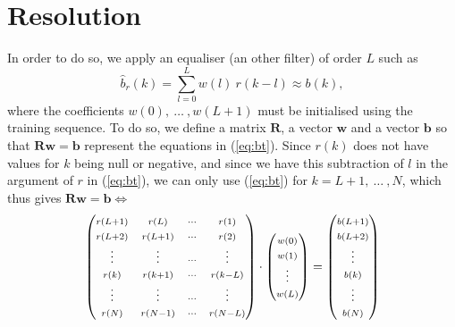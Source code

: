 \documentclass[twocolumn, 12pt]{IEEEtran}
\begin{document}
 \section{Resolution}
 
 In order to do so, we apply an equaliser (an other filter) of order $L$ such as 
 \begin{equation}\label{eq:bt}
 { \hat{b}_{r}(k) = \sum\limits_{l=0}^{L}w(l)~r(k-l) \approx b(k) },
 \end{equation}
 where the coefficients ${w(0)},~{\dots~},{w(L+1)}$ must be initialised using the training sequence. To do so, we define a matrix $\bm{R}$, a vector $\bm{w}$ and a vector $\bm{b}$ so that $\bm{Rw}=\bm{b}$ represent the equations in (\ref{eq:bt}). Since $r(k)$ does not have values for $k$ being null or negative, and since we have this subtraction of $l$ in the argument of $r$ in (\ref{eq:bt}), we can only use (\ref{eq:bt}) for $k = L+1,~\dots~, N$, which thus gives $\bm{Rw}=\bm{b} \Leftrightarrow $
\begin{equation}\label{eq:matrixes}
\begin{pmatrix}
    \mathsmaller{r(L+1)}   & \mathsmaller{r(L)} & \mathsmaller{\cdots}  & \mathsmaller{r(1)} \\
    \mathsmaller{r(L+2)}   & \mathsmaller{r(L+1)} & \mathsmaller{\cdots}  & \mathsmaller{r(2)} \\
    \mathsmaller{\vdots}   & \mathsmaller{\vdots} & \mathsmaller{\cdots} & \mathsmaller{\vdots} \\
    \mathsmaller{r(k)}     & \mathsmaller{r(k+1)} & \mathsmaller{\cdots} & \mathsmaller{r(k-L)} \\
    \mathsmaller{\vdots}   & \mathsmaller{\vdots} & \mathsmaller{\cdots} & \mathsmaller{\vdots} \\
    \mathsmaller{r(N)} & \mathsmaller{r(N-1)} & \mathsmaller{\cdots}  & \mathsmaller{r(N-L)}
\end{pmatrix}
\cdot
\begin{pmatrix}
   \mathsmaller{w(0)}\\
   \mathsmaller{w(1)}\\
   \mathsmaller{\vdots}\\
   \mathsmaller{w(L)}
\end{pmatrix}
=
\begin{pmatrix}
   \mathsmaller{b(L+1)}\\
   \mathsmaller{b(L+2)}\\
   \mathsmaller{\vdots}\\
   \mathsmaller{b(k)}\\
   \mathsmaller{\vdots}\\
   \mathsmaller{b(N)}
\end{pmatrix}
\end{equation}
\end{document}
